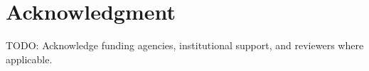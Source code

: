 \section*{Acknowledgment}


TODO: Acknowledge funding agencies, institutional support, and reviewers where applicable.
